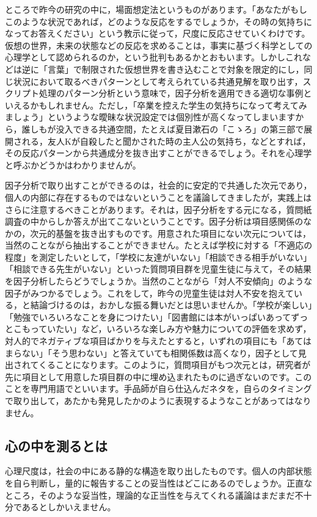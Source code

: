 \documentclass{ltjsbook}
\begin{document}
ところで昨今の研究の中に，場面想定法というものがあります。「あなたがもしこのような状況であれば，どのような反応をするでしょうか，その時の気持ちになってお答えください」という教示に従って，尺度に反応させていくわけです。仮想の世界，未来の状態などの反応を求めることは，事実に基づく科学としての心理学として認められるのか，という批判もあるかとおもいます。しかしこれなどは逆に「言葉」で制限された仮想世界を書き込むことで対象を限定的にし，同じ状況において取るべきパターンとして考えられている共通見解を取り出す，スクリプト処理のパターン分析という意味で，因子分析を適用できる適切な事例といえるかもしれません。ただし，「卒業を控えた学生の気持ちになって考えてみましょう」というような曖昧な状況設定では個別性が高くなってしまいますから，誰しもが没入できる共通空間，たとえば夏目漱石の「こゝろ」の第三部で展開される，友人Kが自殺したと聞かされた時の主人公の気持ち，などとすれば，その反応パターンから共通成分を抜き出すことができるでしょう。それを心理学と呼ぶかどうかはわかりませんが。

因子分析で取り出すことができるのは，社会的に安定的で共通した次元であり，個人の内部に存在するものではないということを議論してきましたが，実践上はさらに注意するべきことがあります。それは，因子分析をする元になる，質問紙調査の中からしか答えが出てこないということです。因子分析は項目感関係のなかの，次元的基盤を抜き出すものです。用意された項目にない次元については，当然のことながら抽出することができません。たとえば学校に対する「不適応の程度」を測定したいとして，「学校に友達がいない」「相談できる相手がいない」「相談できる先生がいない」といった質問項目群を児童生徒に与えて，その結果を因子分析したらどうでしょうか。当然のことながら「対人不安傾向」のような因子がみつかるでしょう。これをして，昨今の児童生徒は対人不安を抱えている，と結論づけるのは，おかしな振る舞いだとは思いませんか。「学校が楽しい」「勉強でいろいろなことを身につけたい」「図書館には本がいっぱいあってずっとこもっていたい」など，いろいろな楽しみ方や魅力についての評価を求めず，対人的でネガティブな項目ばかりを与えたとすると，いずれの項目にも「あてはまらない」「そう思わない」と答えていても相関係数は高くなり，因子として見出されてくることになります。このように，質問項目がもつ次元とは，研究者が先に項目として用意した項目群の中に埋め込まれたものに過ぎないのです。このことを専門用語で\parencite{kosugi2018}といいます。手品師が自ら仕込んだネタを，自らのタイミングで取り出して，あたかも発見したかのように表現するようなことがあってはなりません。

\subsection{心の中を測るとは}
心理尺度は，社会の中にある静的な構造を取り出したものです。個人の内部状態を自ら判断し，量的に報告することの妥当性はどこにあるのでしょうか。正直なところ，そのような妥当性，理論的な正当性を与えてくれる議論はまだまだ不十分であるとしかいえません。
\end{document}

